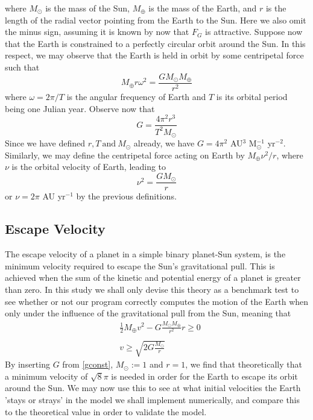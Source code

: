 	where $M_\odot$ is the mass of the Sun, $M_\oplus$ is the mass of the Earth, and $r$ is the length of the radial vector pointing from the Earth to the Sun. Here we also omit the minus sign, assuming it is known by now that $F_G$ is attractive. Suppose now that the Earth is constrained to a perfectly circular orbit around the Sun. In this respect, we may observe that the Earth is held in orbit by some centripetal force such that
	\[
	M_\oplus r\omega^2 = \frac{GM_\odot M_\oplus}{r^2}
	\]
	where $\omega = 2\pi/T$ is the angular frequency of Earth and $T$ is its orbital period being one Julian year. Observe now that
	\begin{equation}
	G = \frac{4\pi^2r^3}{T^2M_\odot}\label{gconst}
	\end{equation}
	Since we have defined $r, T \ \text{and} \  M_\odot$ already, we have $G = 4\pi^2$ AU$^3$ M$^{-1}_\odot$ yr$^{-2}$. Similarly, we may define the centripetal force acting on Earth by $M_\oplus \nu^2/r$, where $\nu$ is the orbital velocity of Earth, leading to
	\[
	\nu^2 = \frac{GM_\odot}{r}
	\]
	or $\nu = 2\pi$ AU yr$^{-1}$ by the previous definitions.   
	
	\subsection{Escape Velocity}
	The escape velocity of a planet in a simple binary planet-Sun system, is the minimum velocity required to escape the Sun's gravitational pull. This is achieved when the sum of the kinetic and potential energy of a planet is greater than zero. In this study we shall only devise this theory as a benchmark test to see whether or not our program correctly computes the motion of the Earth when only under the influence of the gravitational pull from the Sun, meaning that
	\begin{align}
	    &\frac{1}{2}M_\oplus v^2 - G\frac{M_\odot M_\oplus}{r^2}r \geq 0\\
	    \\
	    &v \geq \sqrt{2G\frac{M_\odot}{r}}
	\end{align}
	By inserting $G$ from \eqref{gconst}, $M_\odot := 1 $ and $r = 1$, we find that theoretically that a minimum velocity of $\sqrt{8}\pi$ is needed in order for the Earth to escape its orbit around the Sun. We may now use this to see at what initial velocities the Earth 'stays or strays' in the model we shall implement numerically, and compare this to the theoretical value in order to validate the model.
	
